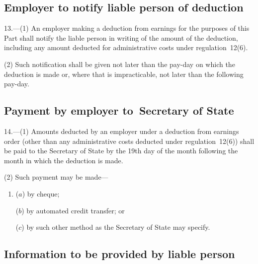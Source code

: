 \documentclass[12pt,a4paper]{article}
\begin{document}

\subsection[13. Employer to notify liable person of deduction]{Employer to notify liable person of deduction}

13.—(1) An employer making a deduction from earnings for the purposes of this Part shall notify the liable person in writing of the amount of the deduction, including any amount deducted for administrative costs under regulation~12(6).

(2) Such notification shall be given not later than the pay-day on which the deduction is made or, where that is impracticable, not later than the following pay-day.

\subsection[14. Payment by employer to~Secretary of State]{Payment by employer to~Secretary of State}

14.—(1) Amounts deducted by an employer under a deduction from earnings order (other than any administrative costs deducted under regulation~12(6)) shall be paid to the Secretary of State by the 19th day of the month following the month in which the deduction is made.

(2) Such payment may be made—
\begin{enumerate}\item[]
($a$) by cheque;

($b$) by automated credit transfer; or

($c$) by such other method as the Secretary of State may specify.
\end{enumerate}

\subsection[15. Information to be provided by liable person]{Information to be provided by liable person}
\end{document}
